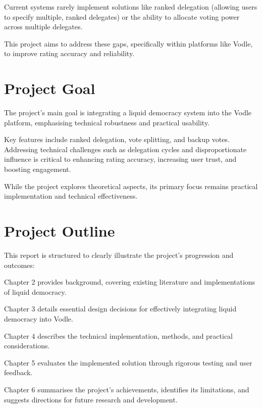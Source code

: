 Current systems rarely implement solutions like ranked delegation (allowing users to specify multiple, ranked delegates) or the ability to allocate voting power across multiple delegates.

This project aims to address these gaps, specifically within platforms like Vodle, to improve rating accuracy and reliability.

\section{Project Goal}
The project's main goal is integrating a liquid democracy system into the Vodle platform, emphasising technical robustness and practical usability.

Key features include ranked delegation, vote splitting, and backup votes. Addressing technical challenges such as delegation cycles and disproportionate influence is critical to enhancing rating accuracy, increasing user trust, and boosting engagement.

While the project explores theoretical aspects, its primary focus remains practical implementation and technical effectiveness.

\section{Project Outline}
This report is structured to clearly illustrate the project's progression and outcomes:

Chapter 2 provides background, covering existing literature and implementations of liquid democracy.

Chapter 3 details essential design decisions for effectively integrating liquid democracy into Vodle.

Chapter 4 describes the technical implementation, methods, and practical considerations.

Chapter 5 evaluates the implemented solution through rigorous testing and user feedback.

Chapter 6 summarises the project's achievements, identifies its limitations, and suggests directions for future research and development.